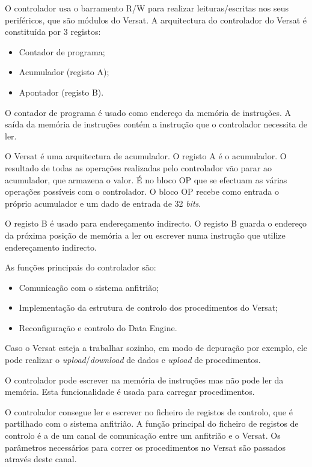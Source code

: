 \pagebreak

O controlador usa o barramento R/W para realizar leituras/escritas nos seus periféricos, que são módulos do Versat. A arquitectura do controlador do Versat é constituída por 3 registos:

\begin{itemize}
  \item Contador de programa;
  \item Acumulador (registo A);
  \item Apontador (registo B).
\end{itemize}

O contador de programa é usado como endereço da memória de instruções. A saída da memória de instruções contém a instrução que o controlador necessita de ler.

O Versat é uma arquitectura de acumulador. O registo A é o acumulador. O resultado de todas as operações realizadas pelo controlador vão parar ao acumulador, que armazena o valor.  
É no bloco OP que se efectuam as várias operações possíveis com o controlador. O bloco OP recebe como entrada o próprio acumulador e um dado de entrada de 32 {\it bits}. %

O registo B é usado para endereçamento indirecto. O registo B guarda o endereço da próxima posição de memória a ler ou escrever numa instrução que utilize endereçamento indirecto. 


As funções principais do controlador são:

\begin{itemize}
  \item Comunicação com o sistema anfitrião;
  \item Implementação da estrutura de controlo dos procedimentos do Versat;
  \item Reconfiguração e controlo do Data Engine.
\end{itemize}

Caso o Versat esteja a trabalhar sozinho, em modo de depuração por exemplo, ele pode realizar o {\it upload}/{\it download} de dados e {\it upload} de procedimentos.

O controlador pode escrever na memória de instruções mas não pode ler da memória. Esta funcionalidade é usada para carregar procedimentos.
    
O controlador consegue ler e escrever no ficheiro de registos de controlo, que é partilhado com o sistema anfitrião. A função principal do ficheiro de registos de controlo é a de um canal de comunicação entre um anfitrião e o Versat. Os parâmetros necessários para correr os procedimentos no Versat são passados através deste canal.
    
